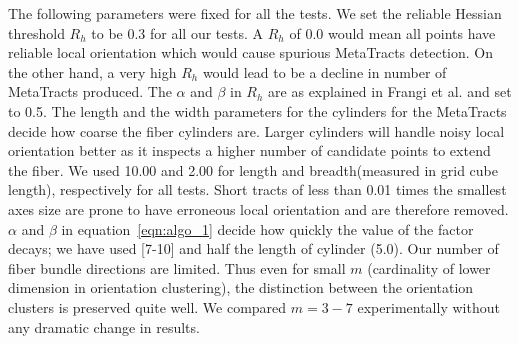 The following parameters were fixed for all the tests. We set the reliable Hessian threshold $R_{h}$ to be 0.3 for all our tests. A $R_{h}$ of 0.0 would mean all points have reliable local orientation which would cause spurious MetaTracts detection. On the other hand, a very high $ R_{h}$ would lead to be a decline in number of MetaTracts produced. The $\alpha$ and $\beta$ in $R_{h}$ are as explained in Frangi et al. \cite{Frangi1998} and set to 0.5. The length and the width parameters for the cylinders for the MetaTracts decide how coarse the fiber cylinders are. Larger cylinders will handle noisy local orientation better as it inspects a higher number of candidate points to extend the fiber. We used 10.00 and 2.00 for length and breadth(measured in grid cube length), respectively for all tests. Short tracts of less than 0.01 times the smallest axes size are prone to have erroneous local orientation and are therefore removed. $\alpha$ and $\beta$ in equation~\ref{eqn:algo_1} decide how quickly the value of the factor decays; we have used [7-10] and half the length of cylinder (5.0). Our number of fiber bundle directions are limited. Thus even for small $m$ (cardinality of lower dimension in orientation clustering), the distinction between the orientation clusters is preserved quite well. We compared  $m=3-7$ experimentally without any dramatic change in results. 
%

 


